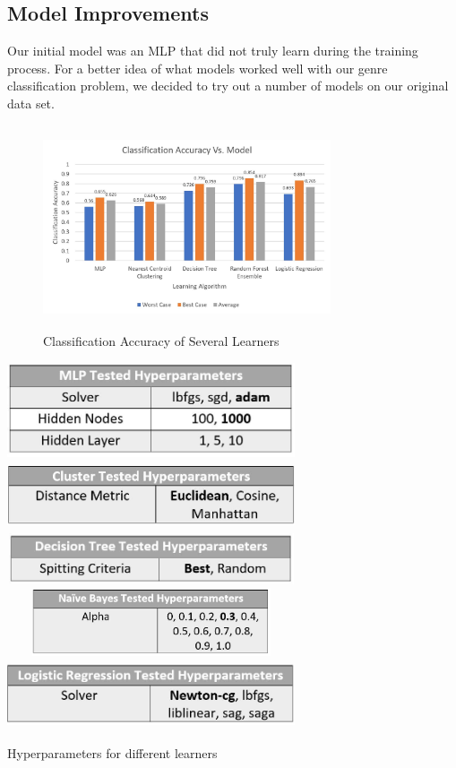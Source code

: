 \documentclass{article}
\begin{document}
\subsection{Model Improvements}

Our initial model was an MLP that did not truly learn during the training process. For a better idea of what models worked well with our genre classification problem, we decided to try out a number of models on our original data set. \par
\begin{figure}[b]
  \includegraphics[width=8.5cm,height=6cm]{Figure1.JPG}
  \caption{Classification Accuracy of Several Learners}
\end{figure}
\begin{table}
  \includegraphics[width=8.5cm,height=2.8cm]{Table3.JPG}
  \includegraphics[width=8.5cm,height=2cm]{Table4.JPG}
  \includegraphics[width=8.5cm,height=1.5cm]{Table5.JPG}
  \includegraphics[width=8.5cm,height=2cm]{Table6.JPG}
  \includegraphics[width=8.5cm,height=2cm]{Table7.JPG}
  \caption{Hyperparameters for different learners}
\end{table}
\end{document}
